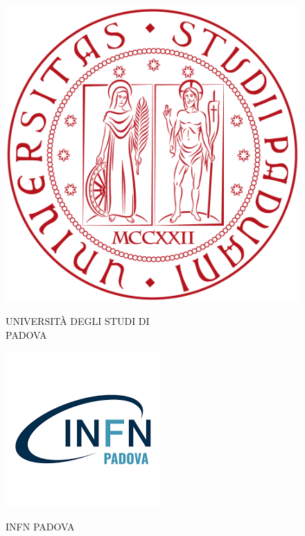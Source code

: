 \documentclass[11pt]{article}
\renewcommand{\>}{\rangle} \renewcommand{\emptyset}{\varnothing}
\begin{document}
\begin{figure}[]
  \centering
\vspace{1cm}
  \begin{minipage}[t]{.45\textwidth}
    \centering \includegraphics[width=.3\linewidth]{images/Padova}
\begin{center}
  {\large{U}\normalsize{NIVERSITÀ DEGLI}\large{ S}\normalsize{TUDI DI}}\\
  {\large{ P}\normalsize{ADOVA}}
\end{center}
  \end{minipage}%
  \hspace{0.5cm}
  \begin{minipage}[t]{.45\textwidth}
    \centering \includegraphics[width=.4\linewidth]{images/infn}
\begin{center}
  {\large{I}\normalsize{NFN }\large{ P}\normalsize{ADOVA}}
\end{center}
  \end{minipage}
\end{figure}
\end{document}

